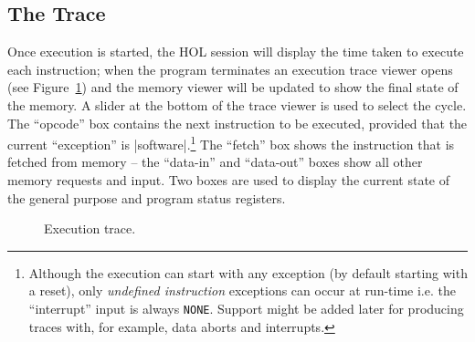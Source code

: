 \documentclass[12pt]{article}
\newcommand{\F}{Figure~}
\begin{document}
\subsection*{The Trace}

Once execution is started, the HOL session will display the time taken to execute each instruction; when the program terminates an execution trace viewer opens (see \F\ref{trace:fig}) and the memory viewer will be updated to show the final state of the memory.  A slider at the bottom of the trace viewer is used to select the cycle.  The ``opcode'' box contains the next instruction to be executed, provided that the current ``exception'' is |software|.\footnote{Although the execution can start with any exception (by default starting with a reset), only \emph{undefined instruction} exceptions can occur at run-time i.e. the ``interrupt'' input is always \texttt{NONE}.  Support might be added later for producing traces with, for example, data aborts and interrupts.}  The ``fetch'' box shows the instruction that is fetched from memory -- the ``data-in'' and ``data-out'' boxes show all other memory requests and input.  Two boxes are used to display the current state of the general purpose and program status registers.
\begin{figure}
\begin{center}
\caption{Execution trace.}
\label{trace:fig}
\end{center}
\end{figure}
\end{document}
